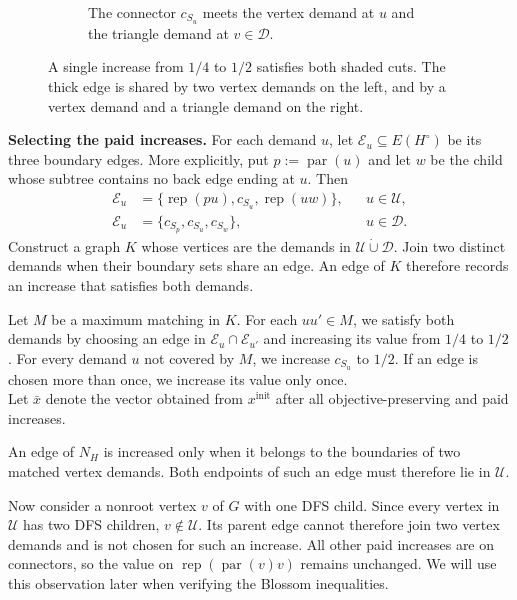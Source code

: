 \documentclass[11pt]{amsart}
\newcommand{\rep}[1]{\operatorname{rep}(#1)}
\newcommand{\1}{\mathbbm{1}}
\begin{document}
\begin{figure}[H]
\begin{subfigure}[t]{.49\textwidth}
\caption{The connector $c_{S_u}$ meets the vertex demand at $u$ and the triangle demand at $v\in\mathcal D$.}
\end{subfigure}
\caption{A single increase from $1/4$ to $1/2$ satisfies both shaded
cuts. The thick edge is shared by two vertex demands on the left,
and by a vertex demand and a triangle demand on the right.}
\label{fig:demand-shared-repairs}
\end{figure}

\textbf{Selecting the paid increases.}
For each demand $u$, let $\mathcal E_u\subseteq E(H^\circ)$
be its three boundary edges.
More explicitly, put $p:=\operatorname{par}(u)$ and let $w$ be the
child whose subtree contains no back edge ending at $u$. Then
\[
\begin{aligned}
 \mathcal E_u&=\{\rep{pu},c_{S_u},\rep{uw}\},
     &&u\in\mathcal U,\\
 \mathcal E_u&=\{c_{S_p},c_{S_u},c_{S_w}\},
     &&u\in\mathcal D.
\end{aligned}
\]
Construct a graph $K$ whose vertices are the demands in
$\mathcal U\mathbin{\dot\cup}\mathcal D$.
Join two distinct demands when their boundary sets share an edge.
An edge of $K$ therefore records an increase that satisfies both demands.

Let $M$ be a maximum matching in $K$. For each $uu'\in M$,
we satisfy both demands by choosing an edge in
$\mathcal E_u\cap\mathcal E_{u'}$ and increasing its value
from $1/4$ to $1/2$. For every demand $u$ not covered by
$M$, we increase $c_{S_u}$ to $1/2$. If an edge is chosen more
than once, we increase its value only once. \\
Let $\bar x$ denote
the vector obtained from $x^{\mathrm{init}}$ after all
objective-preserving and paid increases.

An edge of $N_H$ is increased only when it belongs to the
boundaries of two matched vertex demands. Both endpoints of such
an edge must therefore lie in $\mathcal U$.

Now consider a nonroot vertex $v$ of $G$ with one DFS child. Since every
vertex in $\mathcal U$ has two DFS children, $v\notin\mathcal U$.
Its parent edge cannot therefore join two vertex demands
and is not chosen for such an increase. All other paid
increases are on connectors, so the value on
$\rep{\operatorname{par}(v)v}$ remains unchanged. We will use this observation
later when verifying the Blossom inequalities.
\end{document}
